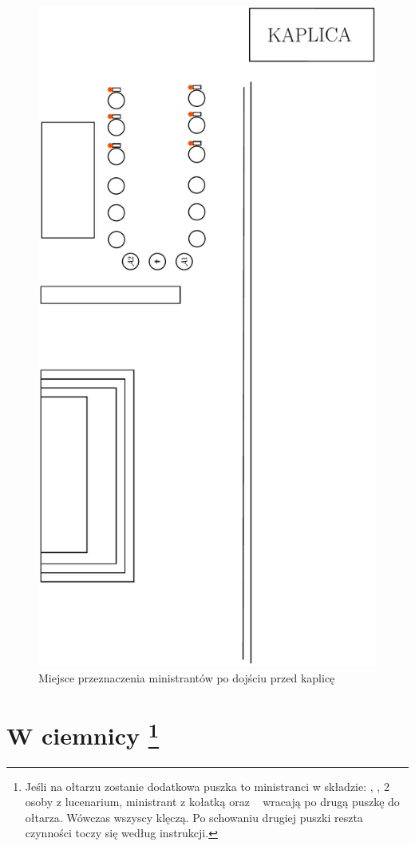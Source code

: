 \begin{figure}[h]
      \centering
      \includegraphics[width=0.5\linewidth,angle=270]{Figures/Czwartek/Procesja4.pdf}
      \caption{Miejsce przeznaczenia ministrantów po dojściu przed kaplicę}
      \label{fig:procesja4}
\end{figure}

\section{W ciemnicy \protect\footnote{Jeśli na ołtarzu zostanie dodatkowa puszka to
        ministranci w składzie: \ii,  , 2 osoby z lucenarium, ministrant z kołatką
        oraz \oo~ wracają po drugą puszkę do ołtarza. Wówczas wszyscy klęczą. Po
        schowaniu drugiej puszki reszta czynności toczy się według instrukcji.}}

